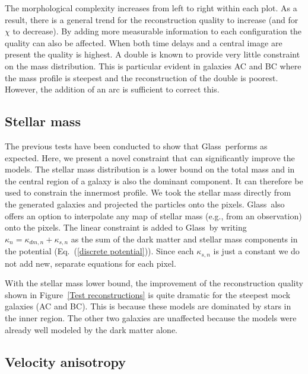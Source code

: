 \documentclass[galley]{mn2e}
\newcommand{\Glass}{{\sc Glass}}
\newcommand{\figref}[1] {Figure~\ref{#1}}
\newcommand{\eqnref}[1] {Eq.~(\ref{#1})}
\begin{document}
The morphological complexity increases from left to right within each plot. As
a result, there is a general trend for the reconstruction quality to increase
(and for $\chi$ to decrease). By adding more measurable information to each
configuration the quality can also be affected. When both time delays and a
central image are present the quality is highest. A double is known to provide
very little constraint on the mass distribution. This is particular evident in
galaxies AC and BC where the mass profile is steepest and the reconstruction of
the double is poorest. However, the addition of an arc is sufficient to correct
this.

\subsection{Stellar mass}
\label{stellar mass}

The previous tests have been conducted to show that \Glass\ performs as expected.
Here, we present a novel constraint that can significantly improve the models. 
The stellar mass distribution is a lower bound on the total mass and in the
central region of a galaxy is also the dominant component. It can therefore be
used to constrain the innermost profile. We took the stellar mass directly from
the generated galaxies and projected the particles onto the pixels. \Glass\
also offers an option to interpolate any map of stellar mass (e.g., from an
observation) onto the pixels. The linear constraint is added to \Glass\ by
writing $\kappa_n = \kappa_{dm,n} + \kappa_{s,n}$ as the sum of the
dark matter and stellar mass components in the potential (\eqnref{discrete
potential}). Since each $\kappa_{s,n}$ is just a constant we do not add new,
separate equations for each pixel. 

With the stellar mass lower bound, the improvement of the reconstruction
quality shown in \figref{Test reconstructions} is quite dramatic for the
steepest mock galaxies (AC and BC). This is because these models are dominated
by stars in the inner region. The other two galaxies are unaffected because the
models were already well modeled by the dark matter alone.

\subsection{Velocity anisotropy}
\end{document}
